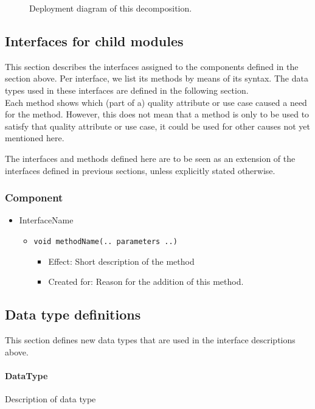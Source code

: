         \begin{figure}[!h]
        	\centering
        	\caption{Deployment diagram of this decomposition.}
            \label{fig:FIGURELABEL}
        \end{figure}


\subsection{Interfaces for child modules}\label{add2-interfaces}
    This section describes the interfaces assigned to the components defined
    in the section above. Per interface, we list its methods by means of its
    syntax. The data types used in these interfaces are defined in the following section. \\

    Each method shows which (part of a) quality attribute or use case caused
    a need for the method. However, this does not mean that a method is
    only to be used to satisfy that quality  attribute or use case, it could
    be used for other causes not yet mentioned here.

    The interfaces and methods defined here are to be seen as an
    extension of the interfaces defined in previous sections, unless
    explicitly stated otherwise.

    \subsubsection{Component}
        \begin{itemize}
            \item InterfaceName
            \begin{itemize}
                \item \texttt{void methodName(.. parameters ..)}
                \begin{itemize}
                    \item Effect: Short description of the method
                    \item Created for: Reason for the addition of this method.
                \end{itemize}
            \end{itemize}
        \end{itemize}

\subsection{Data type definitions}
    This section defines new data types that are used in the interface descriptions above.

    \paragraph{DataType}
        Description of data type
